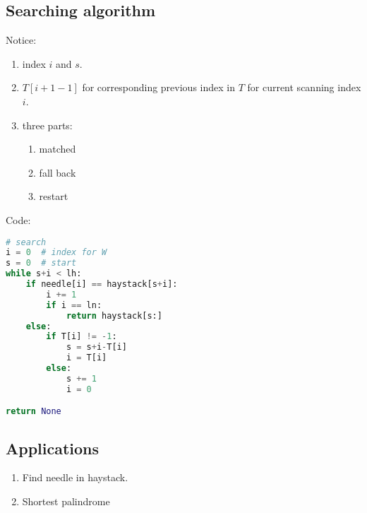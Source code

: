 \subsection{Searching algorithm}
Notice:
\begin{enumerate}
\item index $i$ and $s$.
\item $T[i+1-1]$ for corresponding previous index in $T$ for current scanning index $i$. 
\item three parts:
\begin{enumerate}
\item matched
\item fall back
\item restart 
\end{enumerate}
\end{enumerate}
Code: 
\begin{lstlisting}[language=python]
# search
i = 0  # index for W 
s = 0  # start 
while s+i < lh:
    if needle[i] == haystack[s+i]:
        i += 1
        if i == ln:
            return haystack[s:]
    else:
        if T[i] != -1:
            s = s+i-T[i]
            i = T[i]
        else:
            s += 1
            i = 0

return None
\end{lstlisting}
\subsection{Applications}
\begin{enumerate}
\item Find needle in haystack. 
\item Shortest palindrome 
\end{enumerate}

